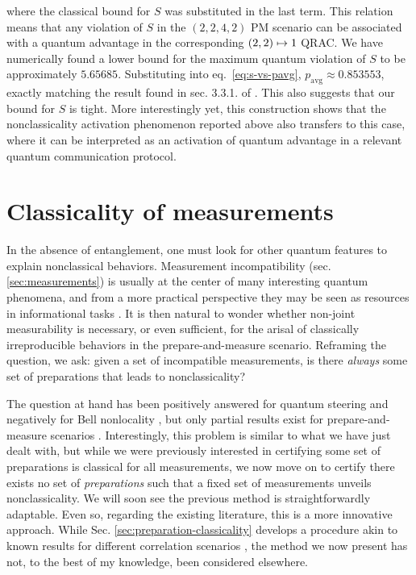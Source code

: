             where the classical bound for $S$ was substituted in the last term. This relation means that any violation of $S$ in the $(2,2,4,2)$ PM scenario can be associated with a quantum advantage in the corresponding $\left( 2, 2 \right) \mapsto 1$ QRAC. We have numerically found a lower bound for the maximum quantum violation of $S$ to be approximately $5.65685$. Substituting into eq.~\eqref{eq:s-vs-pavg}, $p_{\text{avg}} \approx 0.853553$, exactly matching the result found in sec. 3.3.1. of \cite{ambainis_srqracs_2009}. This also suggests that our bound for $S$ is tight. More interestingly yet, this construction shows that the nonclassicality activation phenomenon reported above also transfers to this case, where it can be interpreted as an activation of quantum advantage in a relevant quantum communication protocol. 


    \section{Classicality of measurements}
    \label{sec:measurement-classicality}

        In the absence of entanglement, one must look for other quantum features to explain nonclassical behaviors. Measurement incompatibility (sec. \ref{sec:measurements}) is usually at the center of many interesting quantum phenomena, and from a more practical perspective they may be seen as resources in informational tasks \cite{giovannetti_metrology_2006}. It is then natural to wonder whether non-joint measurability is necessary, or even sufficient, for the arisal of classically irreproducible behaviors in the prepare-and-measure scenario. Reframing the question, we ask: given a set of incompatible measurements, is there \emph{always} some set of preparations that leads to nonclassicality?

        The question at hand has been positively answered for quantum steering \cite{quintino_incompatibilitysteering_2014,uola_incompatibilitysteering_2014,uola_onetoonesteering_2015} and negatively for Bell nonlocality \cite{quintino_2016_incompatibilitybell,quintino_2018_incompatibilitybellgeneral,bene_2018_incompatibilitybell}, but only partial results exist for prepare-and-measure scenarios \cite{carmeli_racsincompatibility_2020}. Interestingly, this problem is similar to what we have just dealt with, but while we were previously interested in certifying some set of preparations is classical for all measurements, we now move on to certify there exists no set of \emph{preparations} such that a fixed set of measurements unveils nonclassicality. We will soon see the previous method is straightforwardly adaptable. Even so, regarding the existing literature, this is a more innovative approach. While Sec. \ref{sec:preparation-classicality} develops a procedure akin to known results for different correlation scenarios \cite{cavalcanti_generalmethod_2016,hirsch_algorithmic_2016}, the method we now present has not, to the best of my knowledge, been considered elsewhere.

